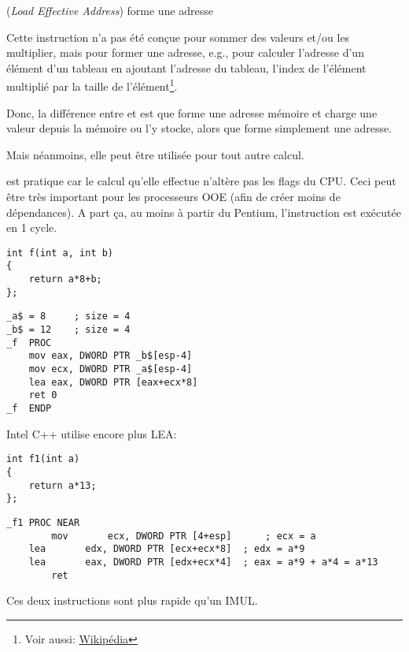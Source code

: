\item[LEA] (\emph{Load Effective Address}) forme une adresse

\label{sec:LEA}

\newcommand{\URLAM}{\href{http://go.yurichev.com/17109}{Wikipédia}}

Cette instruction n'a pas été conçue pour sommer des valeurs et/ou les multiplier,
mais pour former une adresse, e.g., pour calculer l'adresse d'un élément d'un tableau
en ajoutant l'adresse du tableau, l'index de l'élément multiplié par la taille de
l'élément\footnote{Voir aussi: \URLAM}.
\par
Donc, la différence entre \MOV et \LEA est que \MOV forme une adresse mémoire et
charge une valeur depuis la mémoire ou l'y stocke, alors que \LEA forme simplement une adresse.
\par
Mais néanmoins, elle peut être utilisée pour tout autre calcul.
\par
\LEA est pratique car le calcul qu'elle effectue n'altère pas les flags du \ac{CPU}.
Ceci peut être très important pour les processeurs \ac{OOE} (afin de créer moins de dépendances).
A part ça, au moins à partir du Pentium, l'instruction \LEA est exécutée en 1 cycle.

\begin{lstlisting}[style=customc]
int f(int a, int b)
{
	return a*8+b;
};
\end{lstlisting}

\begin{lstlisting}[caption=MSVC 2010 \Optimizing,style=customasmx86]
_a$ = 8		; size = 4
_b$ = 12	; size = 4
_f	PROC
	mov	eax, DWORD PTR _b$[esp-4]
	mov	ecx, DWORD PTR _a$[esp-4]
	lea	eax, DWORD PTR [eax+ecx*8]
	ret	0
_f	ENDP
\end{lstlisting}

Intel C++ utilise encore plus LEA:

\begin{lstlisting}[style=customc]
int f1(int a)
{
	return a*13;
};
\end{lstlisting}

\begin{lstlisting}[caption=Intel C++ 2011,style=customasmx86]
_f1	PROC NEAR
        mov       ecx, DWORD PTR [4+esp]      ; ecx = a
	lea       edx, DWORD PTR [ecx+ecx*8]  ; edx = a*9
	lea       eax, DWORD PTR [edx+ecx*4]  ; eax = a*9 + a*4 = a*13
        ret
\end{lstlisting}

Ces deux instructions sont plus rapide qu'un IMUL.

